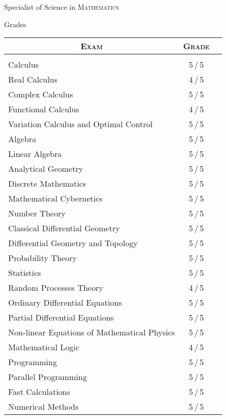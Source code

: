 \documentclass[a4paper,10pt]{article}
\begin{document}
\newpage
\par{\centering\Large \hypertarget{grds}{Specialist of Science in \textsc{Mathematics}}\par}\large{\centering Grades\par}\normalsize
\begin{center}
\begin{tabular}{lcc}
\multicolumn{1}{c}{\textsc{Exam}}&\textsc{Grade}\\ 
\hline\\
Calculus	& 5\,/\,5 \\
Real Calculus &4\,/\,5 \\
Complex Calculus &5\,/\,5 \\
Functional Calculus &4\,/\,5 \\
Variation Calculus and Optimal Control &5\,/\,5 \\

Algebra	        & 5\,/\,5 \\
Linear Algebra & 5\,/\,5 \\
Analytical Geometry &5\,/\,5 \\

Discrete Mathematics &5\,/\,5\\
Mathematical Cybernetics &5\,/\,5 \\
Number Theory &5\,/\,5 \\

Classical Differential Geometry &5\,/\,5 \\
Differential Geometry and Topology&5\,/\,5 \\

Probability Theory &5\,/\,5 \\
Statistics &5\,/\,5 \\
Random Processes Theory &4\,/\,5 \\

Ordinary Differential Equations &5\,/\,5 \\
Partial Differential Equations &5\,/\,5 \\
Non-linear Equations of Mathematical Physics &5\,/\,5 \\

Mathematical Logic &4\,/\,5 \\

Programming &5\,/\,5 \\
Parallel Programming &5\,/\,5 \\
Fast Calculations &5\,/\,5 \\
Numerical Methods &5\,/\,5 \\


\end{tabular}
\end{center}
\end{document}

